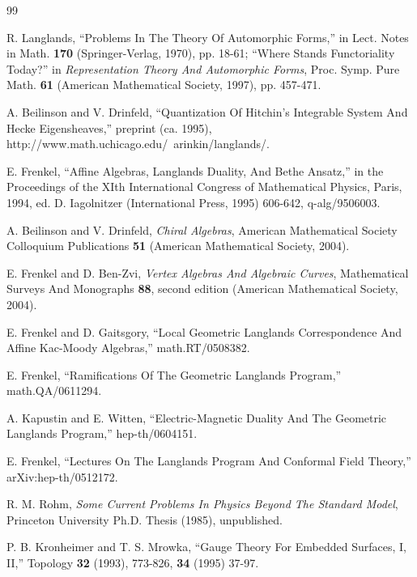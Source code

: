 
\clearpage
\begin{thebibliography}{99}

 R. Langlands,
``Problems In The Theory Of Automorphic Forms,'' in Lect. Notes in
Math. {\bf 170} (Springer-Verlag, 1970), pp. 18-61; ``Where Stands
Functoriality Today?'' in {\it Representation Theory And
Automorphic Forms}, Proc. Symp. Pure Math. {\bf 61} (American
Mathematical Society, 1997), pp. 457-471.

 A. Beilinson
and V. Drinfeld, ``Quantization Of Hitchin's Integrable System And
Hecke Eigensheaves,'' preprint (ca. 1995),
http://www.math.uchicago.edu/~arinkin/langlands/.

 E. Frenkel, ``Affine Algebras, Langlands Duality,
And Bethe Ansatz,'' in the Proceedings of the XIth International
Congress of Mathematical Physics, Paris, 1994, ed. D. Iagolnitzer
(International Press, 1995) 606-642, q-alg/9506003.

 A.
Beilinson and V. Drinfeld, {\it Chiral Algebras}, American
Mathematical Society Colloquium Publications {\bf 51}
(American Mathematical Society, 2004).

 E. Frenkel
and D. Ben-Zvi, {\it Vertex Algebras And Algebraic Curves},
Mathematical Surveys And Monographs {\bf 88},
second edition (American Mathematical Society, 2004).

 E. Frenkel and D. Gaitsgory, ``Local Geometric
Langlands Correspondence And Affine Kac-Moody Algebras,''
math.RT/0508382.

 E. Frenkel, ``Ramifications Of The Geometric Langlands Program,''
math.QA/0611294.

 A. Kapustin and E. Witten, ``Electric-Magnetic Duality
And The Geometric Langlands Program,'' hep-th/0604151.

 E. Frenkel, ``Lectures On The Langlands Program And
Conformal Field Theory,'' arXiv:hep-th/0512172.

 R. M. Rohm, {\it Some Current Problems In
Physics Beyond The Standard Model}, Princeton University Ph.D. Thesis (1985), unpublished.

 P. B. Kronheimer and T. S. Mrowka,
``Gauge Theory For Embedded Surfaces, I, II,'' Topology {\bf 32}
(1993), 773-826, {\bf 34} (1995) 37-97.


\end{thebibliography}
